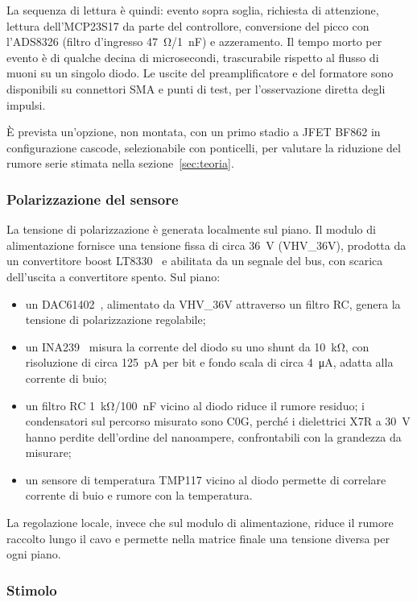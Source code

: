 \documentclass[11pt,a4paper]{article}
\begin{document}
La sequenza di lettura è quindi: evento sopra soglia, richiesta di attenzione, lettura dell'MCP23S17 da parte del controllore, conversione del picco con l'ADS8326 (filtro d'ingresso \SI{47}{\ohm}/\SI{1}{\nano\farad}) e azzeramento. Il tempo morto per evento è di qualche decina di microsecondi, trascurabile rispetto al flusso di muoni su un singolo diodo. Le uscite del preamplificatore e del formatore sono disponibili su connettori SMA e punti di test, per l'osservazione diretta degli impulsi.

È prevista un'opzione, non montata, con un primo stadio a JFET BF862 in configurazione cascode, selezionabile con ponticelli, per valutare la riduzione del rumore serie stimata nella sezione~\ref{sec:teoria}.

\subsubsection{Polarizzazione del sensore}

La tensione di polarizzazione è generata localmente sul piano. Il modulo di alimentazione fornisce una tensione fissa di circa \SI{36}{\volt} (VHV\_36V), prodotta da un convertitore boost LT8330~\cite{lt8330} e abilitata da un segnale del bus, con scarica dell'uscita a convertitore spento. Sul piano:
\begin{itemize}
  \item un DAC61402~\cite{dac61402}, alimentato da VHV\_36V attraverso un filtro RC, genera la tensione di polarizzazione regolabile;
  \item un INA239~\cite{ina239} misura la corrente del diodo su uno shunt da \SI{10}{\kilo\ohm}, con risoluzione di circa \SI{125}{\pico\ampere} per bit e fondo scala di circa \SI{4}{\micro\ampere}, adatta alla corrente di buio;
  \item un filtro RC \SI{1}{\kilo\ohm}/\SI{100}{\nano\farad} vicino al diodo riduce il rumore residuo; i condensatori sul percorso misurato sono C0G, perché i dielettrici X7R a \SI{30}{\volt} hanno perdite dell'ordine del nanoampere, confrontabili con la grandezza da misurare;
  \item un sensore di temperatura TMP117 vicino al diodo permette di correlare corrente di buio e rumore con la temperatura.
\end{itemize}
La regolazione locale, invece che sul modulo di alimentazione, riduce il rumore raccolto lungo il cavo e permette nella matrice finale una tensione diversa per ogni piano.

\subsubsection{Stimolo}
\end{document}
